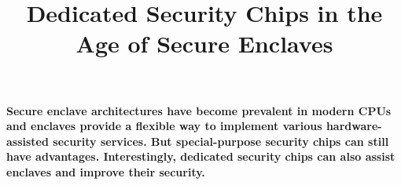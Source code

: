 

\graphicspath{{images/}}

\title{Dedicated Security Chips in the Age of Secure Enclaves} 


\maketitle
\thispagestyle{empty}

{\bfseries
Secure enclave architectures have become prevalent in modern CPUs and enclaves provide a flexible way to implement various hardware-assisted security services. But special-purpose security chips can still have advantages. Interestingly, dedicated security chips can also assist enclaves and improve their security.}








{\small
%

}


